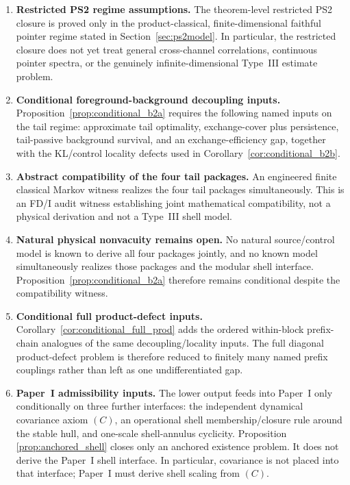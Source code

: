 \documentclass[12pt]{article}
\theoremstyle{definition}
\theoremstyle{remark}
\begin{document}
\begin{enumerate}
\item \textbf{Restricted PS2 regime assumptions.}
The theorem-level restricted PS2 closure is proved only in the
product-classical, finite-dimensional faithful pointer regime stated in
Section~\ref{sec:ps2model}. In particular, the restricted closure does
not yet treat general cross-channel correlations, continuous pointer
spectra, or the genuinely infinite-dimensional Type~III estimate
problem.

\item \textbf{Conditional foreground-background decoupling inputs.}
Proposition~\ref{prop:conditional_b2a} requires the following named
inputs on the tail regime: approximate tail optimality, exchange-cover
plus persistence, tail-passive background survival, and an
exchange-efficiency gap, together with the KL/control locality defects
used in Corollary~\ref{cor:conditional_b2b}.

\item \textbf{Abstract compatibility of the four tail packages.}
An engineered finite classical Markov witness realizes the four tail
packages simultaneously. This is an FD/I audit witness establishing
joint mathematical compatibility, not a physical derivation and not a
Type~III shell model.

\item \textbf{Natural physical nonvacuity remains open.}
No natural source/control model is known to derive all four packages
jointly, and no known model simultaneously realizes those packages and
the modular shell interface. Proposition~\ref{prop:conditional_b2a}
therefore remains conditional despite the compatibility witness.

\item \textbf{Conditional full product-defect inputs.}
Corollary~\ref{cor:conditional_full_prod} adds the ordered within-block
prefix-chain analogues of the same decoupling/locality inputs. The full
diagonal product-defect problem is therefore reduced to finitely many
named prefix couplings rather than left as one undifferentiated gap.

\item \textbf{Paper~I admissibility inputs.}
The lower output feeds into Paper~I only conditionally on three further
interfaces: the independent dynamical covariance axiom \((C)\), an
operational shell membership/closure rule around the stable hull, and
one-scale shell-annulus cyclicity. Proposition~
\ref{prop:anchored_shell} closes only an anchored existence problem. It
does not derive the Paper~I shell interface. In particular, covariance
is not placed into that interface; Paper~I must derive shell scaling
from \((C)\).
\end{enumerate}
 
\end{document}
